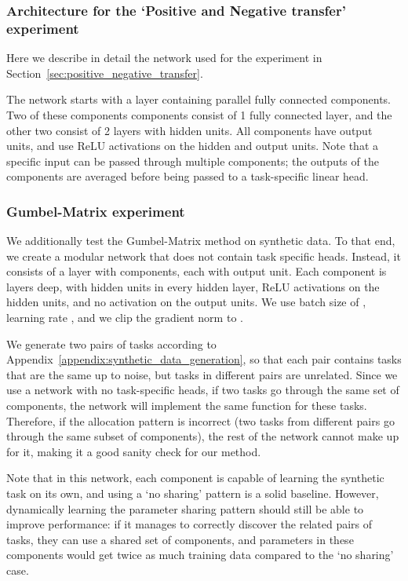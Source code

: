 \documentclass[conference]{IEEEtran}
\begin{document}
\subsubsection{Architecture for the `Positive and Negative transfer' experiment}\label{appendix:positive_negative_transfer_arch}

Here we describe in detail the network used for the experiment in Section~\ref{sec:positive_negative_transfer}.

The network starts with a layer containing  parallel fully connected components. Two of these components components consist of 1 fully connected layer, and the other two consist of 2 layers with  hidden units. All components have  output units, and use ReLU activations on the hidden and output units. Note that a specific input can be passed through multiple components; the outputs of the components are averaged before being passed to a task-specific linear head.

\subsubsection{Gumbel-Matrix experiment}\label{appendix:synthetic_data_gumbel_matrix}

We additionally test the Gumbel-Matrix method on synthetic data. To that end, we create a modular network that does not contain task specific heads. Instead, it consists of a layer with  components, each with  output unit. Each component is  layers deep, with  hidden units in every hidden layer, ReLU activations on the hidden units, and no activation on the output units. We use batch size of , learning rate , and we clip the gradient norm to .

We generate two pairs of tasks according to Appendix~\ref{appendix:synthetic_data_generation}, so that each pair contains tasks that are the same up to noise, but tasks in different pairs are unrelated. Since we use a network with no task-specific heads, if two tasks go through the same set of components, the network will implement the same function for these tasks. Therefore, if the allocation pattern is incorrect (two tasks from different pairs go through the same subset of components), the rest of the network cannot make up for it, making it a good sanity check for our method.

Note that in this network, each component is capable of learning the synthetic task on its own, and using a `no sharing' pattern is a solid baseline. However, dynamically learning the parameter sharing pattern should still be able to improve performance: if it manages to correctly discover the related pairs of tasks, they can use a shared set of components, and parameters in these components would get twice as much training data compared to the `no sharing' case.
\end{document}
